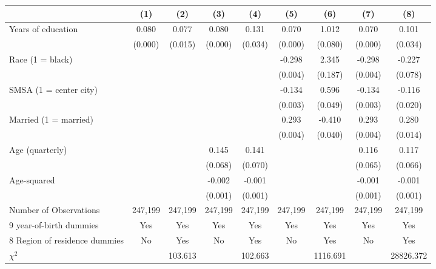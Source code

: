 {
\def\sym#1{\ifmmode^{#1}\else\(^{#1}\)\fi}
\begin{tabular}{l*{8}{c}}
\hline\hline
                    &\multicolumn{1}{c}{(1)}&\multicolumn{1}{c}{(2)}&\multicolumn{1}{c}{(3)}&\multicolumn{1}{c}{(4)}&\multicolumn{1}{c}{(5)}&\multicolumn{1}{c}{(6)}&\multicolumn{1}{c}{(7)}&\multicolumn{1}{c}{(8)}\\
\hline
Years of education  &       0.080&       0.077&       0.080&       0.131&       0.070&       1.012&       0.070&       0.101\\
                    &     (0.000)&     (0.015)&     (0.000)&     (0.034)&     (0.000)&     (0.080)&     (0.000)&     (0.034)\\
Race (1 = black)    &            &            &            &            &      -0.298&       2.345&      -0.298&      -0.227\\
                    &            &            &            &            &     (0.004)&     (0.187)&     (0.004)&     (0.078)\\
SMSA (1 = center city)&            &            &            &            &      -0.134&       0.596&      -0.134&      -0.116\\
                    &            &            &            &            &     (0.003)&     (0.049)&     (0.003)&     (0.020)\\
Married (1 = married)&            &            &            &            &       0.293&      -0.410&       0.293&       0.280\\
                    &            &            &            &            &     (0.004)&     (0.040)&     (0.004)&     (0.014)\\
Age (quarterly)     &            &            &       0.145&       0.141&            &            &       0.116&       0.117\\
                    &            &            &     (0.068)&     (0.070)&            &            &     (0.065)&     (0.066)\\
Age-squared         &            &            &      -0.002&      -0.001&            &            &      -0.001&      -0.001\\
                    &            &            &     (0.001)&     (0.001)&            &            &     (0.001)&     (0.001)\\
\hline
Number of Observations&     247,199&     247,199&     247,199&     247,199&     247,199&     247,199&     247,199&     247,199\\
9 year-of-birth dummies&         Yes&         Yes&         Yes&         Yes&         Yes&         Yes&         Yes&         Yes\\
8 Region of residence dummies&          No&         Yes&          No&         Yes&          No&         Yes&          No&         Yes\\
$\chi^2$            &            &     103.613&            &     102.663&            &    1116.691&            &   28826.372\\
\hline\hline
\end{tabular}
}
